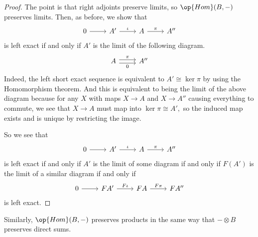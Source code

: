\documentclass[../notes.tex]{subfiles}
\begin{document}
\begin{proof}
	The point is that right adjoints preserve limits, so $\op{Hom}(B,-)$ preserves limits. Then, as before, we show that
	\[\begin{tikzcd}
		0 & {A'} & A & {A''}
		\arrow[from=1-1, to=1-2]
		\arrow["\pi", from=1-3, to=1-4]
		\arrow["\iota", from=1-2, to=1-3]
	\end{tikzcd}\]
	is left exact if and only if $A'$ is the limit of the following diagram.
	\[\begin{tikzcd}
		A & {A''}
		\arrow["\pi", shift left=1, from=1-1, to=1-2]
		\arrow["0"', shift right=1, from=1-1, to=1-2]
	\end{tikzcd}\]
	Indeed, the left short exact sequence is equivalent to $A'\cong\ker\pi$ by using the Homomorphism theorem. And this is equivalent to being the limit of the above diagram because for any $X$ with maps $X\to A$ and $X\to A''$ causing everything to commute, we see that $X\to A$ must map into $\ker\pi\cong A',$ so the induced map exists and is unique by restricting the image.

	So we see that
	\[\begin{tikzcd}
		0 & {A'} & A & {A''}
		\arrow[from=1-1, to=1-2]
		\arrow["\pi", from=1-3, to=1-4]
		\arrow["\iota", from=1-2, to=1-3]
	\end{tikzcd}\]
	is left exact if and only if $A'$ is the limit of some diagram if and only if $F(A')$ is the limit of a similar diagram if and only if
	\[\begin{tikzcd}
		0 & {FA'} & FA & {FA''}
		\arrow[from=1-1, to=1-2]
		\arrow["F\pi", from=1-3, to=1-4]
		\arrow["F\iota", from=1-2, to=1-3]
	\end{tikzcd}\]
	is left exact.
\end{proof}
Similarly, $\op{Hom}(B,-)$ preserves products in the same way that $-\otimes B$ preserves direct sums.
\end{document}
